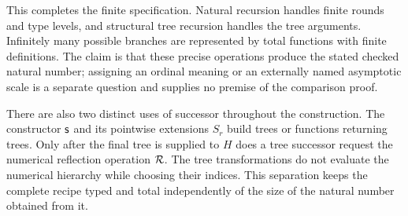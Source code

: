 This completes the finite specification. Natural recursion handles
finite rounds and type levels, and structural tree recursion handles
the tree arguments. Infinitely many possible branches are represented
by total functions with finite definitions. The claim is that these
precise operations produce the stated checked natural number; assigning
an ordinal meaning or an externally named asymptotic scale is a separate
question and supplies no premise of the comparison proof.

There are also two distinct uses of successor throughout the construction.
The constructor \(\mathsf s\) and its pointwise extensions \(S_r\) build trees
or functions returning trees. Only after the final tree is supplied to
\(H\) does a tree successor request the numerical reflection operation
\(\mathcal R\). The tree transformations do not evaluate the numerical hierarchy
while choosing their indices. This separation keeps the complete recipe
typed and total independently of the size of the natural number obtained
from it.
